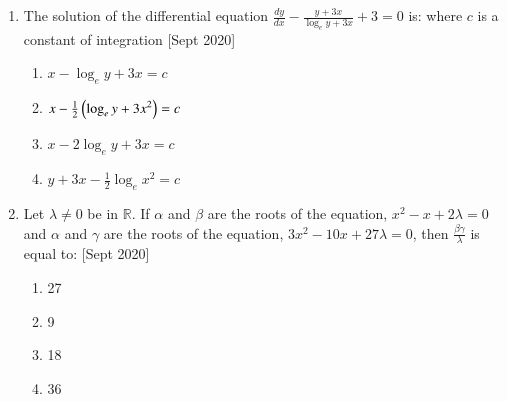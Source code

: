 \documentclass[journal]{IEEEtran}
\begin{document}
\begin{enumerate}
\begin{enumerate}
		\end{enumerate}
	\item 
	The solution of the differential equation $\frac{dy}{dx}-\frac{y+3x}{\log_e{y+3x}} + 3 = 0$ is: where $c$ is a constant of integration
	\hfill [Sept 2020]
		\begin{enumerate}
			\item $x - \log_{e}{y+3x} = c$
			\item $x - \frac{1}{2}\left({\log_{e}{y+3x}}^2\right) = c$
			\item $x - 2\log_{e}{y+3x} = c$
			\item $y + 3x - \frac{1}{2}\log_{e}{x}^{2} = c$
		\end{enumerate}
	\item 
	Let $\lambda \neq 0$ be in $\mathbb{R}$. If $\alpha$ and $\beta$ are the roots of the equation, $x^{2}-x+2\lambda = 0$ and $\alpha$ and $\gamma$ are the roots of the equation, $3x^{2}-10x+27\lambda = 0$, then $\frac{\beta\gamma}{\lambda}$ is equal to:
	\hfill [Sept 2020]
		\begin{enumerate}
			\item 27
			\item 9
			\item 18
			\item 36
		\end{enumerate}
\end{enumerate}
\end{document}
